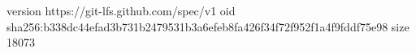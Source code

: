 version https://git-lfs.github.com/spec/v1
oid sha256:b338dc44efad3b731b2479531b3a6efeb8fa426f34f72f952f1a4f9fddf75e98
size 18073
